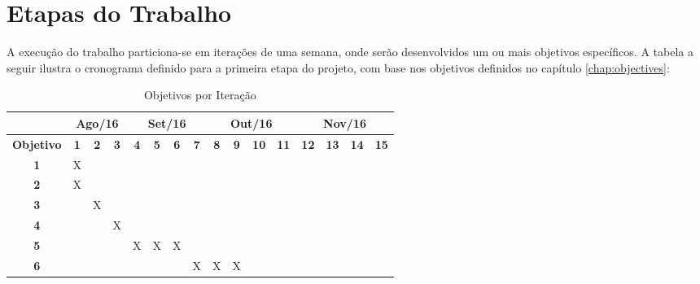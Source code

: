 \chapter{\label{chap:work-plan}Etapas do Trabalho}

A execução do trabalho particiona-se em iterações de uma semana, onde serão
desenvolvidos um ou mais objetivos específicos. A tabela a seguir ilustra o
cronograma definido para a primeira etapa do projeto, com base nos objetivos
definidos no capítulo \ref{chap:objectives}:

\begin{table}[htb!]
\centering
\caption{Objetivos por Iteração}
\label{tab:work-plan}
\begin{tabular}{c|c|c|c|c|c|c|c|c|c|c|c|c|c|c|c|}
\cline{2-16}
{\bf}                                 & \multicolumn{3}{c|}{{\bf Ago/16}} & \multicolumn{4}{c|}{{\bf Set/16}}     & \multicolumn{4}{c|}{{\bf Out/16}}      & \multicolumn{4}{c|}{{\bf Nov/16}}     \\ \hline
\multicolumn{1}{|c|}{{\bf Objetivo}}  & {\bf 1} & {\bf 2} & {\bf 3}	      & {\bf 4} & {\bf 5} & {\bf 6} & {\bf 7} & {\bf 8} & {\bf 9} & {\bf 10} & \bf{11} & \bf{12} & \bf{13} & \bf{14} & \bf{15} \\ \hline
\multicolumn{1}{|c|}{{\bf 1}}         & X       &         &               &         &         &         &         &         &         &          &         &         &         &         &         \\ \hline
\multicolumn{1}{|c|}{{\bf 2}}         & X       &         &               &         &         &         &         &         &         &          &         &         &         &         &         \\ \hline
\multicolumn{1}{|c|}{{\bf 3}}         &         & X       &               &         &         &         &         &         &         &          &         &         &         &         &         \\ \hline
\multicolumn{1}{|c|}{{\bf 4}}         &         &         & X             &         &         &         &         &         &         &          &         &         &         &         &         \\ \hline
\multicolumn{1}{|c|}{{\bf 5}}         &         &         &               & X       & X       & X       &         &         &         &          &         &         &         &         &         \\ \hline
\multicolumn{1}{|c|}{{\bf 6}}         &         &         &               &         &         &         & X       & X       & X       &          &         &         &         &         &         \\ \hline

\end{tabular}
\end{table}

